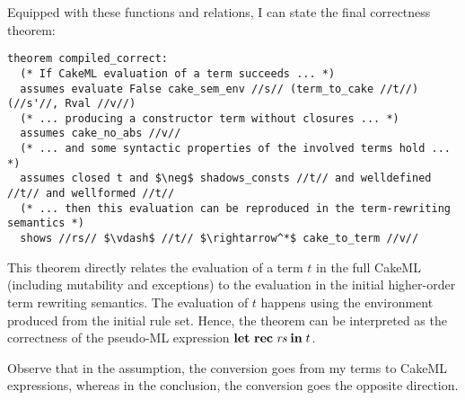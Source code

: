 Equipped with these functions and relations, I can state the final correctness theorem:
%
\begin{lstlisting}[language=Isabelle]
theorem compiled_correct:
  (* If CakeML evaluation of a term succeeds ... *)
  assumes evaluate False cake_sem_env //s// (term_to_cake //t//) (//s'//, Rval //v//)
  (* ... producing a constructor term without closures ... *)
  assumes cake_no_abs //v//
  (* ... and some syntactic properties of the involved terms hold ... *)
  assumes closed t and $\neg$ shadows_consts //t// and welldefined //t// and wellformed //t//
  (* ... then this evaluation can be reproduced in the term-rewriting semantics *)
  shows //rs// $\vdash$ //t// $\rightarrow^*$ cake_to_term //v//
\end{lstlisting}

\noindent
This theorem directly relates the evaluation of a term $t$ in the full CakeML (including mutability and exceptions) to the evaluation in the initial higher-order term rewriting semantics.
The evaluation of $t$ happens using the environment produced from the initial rule set.
Hence, the theorem can be interpreted as the correctness of the pseudo-ML expression $\holkeyword{let\ rec}\;\rs\;\holkeyword{in}\;t$.

Observe that in the assumption, the conversion goes from my terms to CakeML expressions, whereas in the conclusion, the conversion goes the opposite direction.